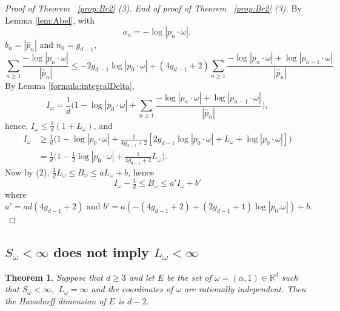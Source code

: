 \documentclass[12pt,reqno,a4paper]{amsart}%
\numberwithin{equation}{section}
\newtheorem{theorem}{Theorem}[section]
\newcommand{\Rr}{{\mathbb{R}}}
\newcommand{\tcm}{\textcolor{magenta}}
\begin{document}
\begin{proof}[Proof of Theorem~ \ref{prop:Br2} (3)]
{\it End of proof of Theorem~ \ref{prop:Br2} (3).}
By Lemma \ref{lem:Abel}, with 
$$
a_n=-\log|p_n\cdot\omega|,
$$ 
$b_n=|\hat p_n|$ and $n_0=g_{d-1}$,
\[
\sum_{n\geq 1}\frac{-\log|p_n\cdot\omega|}{|\hat p_n|}\leq -2g_{d-1}\log|p_0\cdot\omega|+(4g_{d-1}+2)\sum_{n\geq 1}\frac{-\log|p_n\cdot\omega|+\log|p_{n-1}\cdot\omega|}{|\hat p_n|}. 
\]
By Lemma \ref{formula:integralDelta},
\[
I_{\omega}=\frac1d\big(1-\log|p_0\cdot\omega|+\sum_{n\geq 1}\frac{-\log|p_n\cdot\omega|+\log|p_{n-1}\cdot\omega|}{|\hat p_n|}\big),
\]
hence, 
$
I_{\omega}\leq \frac1d(1+L_{\omega})
$, and 
\begin{align*}
	I_{\omega}&\geq \frac1d\big(1-\log|p_0\cdot\omega|+\frac{1}{4g_{d-1}+2}[2g_{d-1}\log|p_0\cdot\omega|+L_{\omega}+\log|p_0\cdot\omega|]\big)\\
	&=\frac1d\big(1-\frac{1}{2}\log|p_0\cdot\omega|+\frac{1}{4g_{d-1}+2}L_{\omega}\big).
\end{align*} 
Now by (2), $\tfrac1d L_{\omega}\leq B_{\omega}\leq aL_{\omega}+b$, hence
\[
I_{\omega}-\tfrac1d\leq B_{\omega}\leq a'I_{\omega}+b'
\]  
where
\[
a'=ad(4g_{d-1}+2) \text{ and } b'=a(-(4g_{d-1}+2)+(2g_{d-1}+1)\log|p_0.\omega|)+b.
\]
\end{proof}



\subsection{$S_{\omega}<\infty$ does not imply $L_{\omega}<\infty$ }
\label{sec:non BC}



\begin{theorem}\label{prop: Hausdorff dim}
Suppose that $d\geq 3$ and let $E$ be the set of
	$\omega=(\alpha,1)\in\Rr^d$  such that $S_{\omega}<\infty$,  $\,L_{\omega}=\infty$ and the coordinates of $\omega$ are rationally independent. Then the Hausdorff dimension of $E$ is $d-2$.
\end{theorem}

\end{document}
